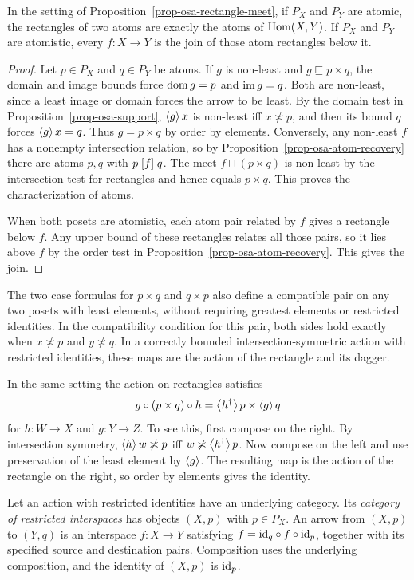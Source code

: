 \begin{prop}\label{prop-osa-atomic-rectangles}
In the setting of Proposition~\ref{prop-osa-rectangle-meet},
if $P_X$ and $P_Y$ are atomic, the rectangles of two atoms
are exactly the atoms of $\operatorname{Hom}(X,Y)$. If $P_X$ and $P_Y$
are atomistic, every $f:X\to Y$ is the join of those atom
rectangles below it.
\end{prop}

\begin{proof}
Let $p\in P_X$ and $q\in P_Y$ be atoms. If $g$ is non-least and
$g\sqsubseteq p\times q$, the domain and image bounds force
$\operatorname{dom} g=p$ and $\operatorname{im} g=q$. Both are non-least, since a least
image or domain forces the arrow to be least. By the domain
test in Proposition~\ref{prop-osa-support}, $\left\langle g\right\rangle x$ is
non-least iff $x\nasymp p$, and then its bound $q$ forces
$\left\langle g\right\rangle x=q$. Thus $g=p\times q$ by order by elements.
Conversely, any non-least $f$ has a nonempty intersection
relation, so by Proposition~\ref{prop-osa-atom-recovery} there
are atoms $p,q$ with $p\mathrel{\left[f\right]}q$. The meet $f\sqcap(p\times q)$
is non-least by the intersection test for rectangles and
hence equals $p\times q$. This proves the characterization of
atoms.

When both posets are atomistic, each atom pair related by $f$
gives a rectangle below $f$. Any upper bound of these rectangles
relates all those pairs, so it lies above $f$ by the order test in
Proposition~\ref{prop-osa-atom-recovery}. This gives the join.
\end{proof}

The two case formulas for $p\times q$ and $q\times p$ also define
a compatible pair on any two posets with least elements, without
requiring greatest elements or restricted identities. In the
compatibility condition for this pair, both sides hold exactly
when $x\nasymp p$ and $y\nasymp q$. In a correctly bounded
intersection-symmetric action with restricted identities, these
maps are the action of the rectangle and its dagger.

In the same setting the action on rectangles satisfies
\[
 g\circ(p\times q)\circ h=\left\langle h^\dagger\right\rangle p\times\left\langle g\right\rangle q
\]
for $h:W\to X$ and $g:Y\to Z$. To see this, first compose on the
right. By intersection symmetry, $\left\langle h\right\rangle w\not\asymp p$ iff
$w\not\asymp\left\langle h^\dagger\right\rangle p$. Now compose on the left and use
preservation of the least element by $\left\langle g\right\rangle$. The resulting map
is the action of the rectangle on the right, so order by elements
gives the identity.

\begin{defn}\label{def-osa-restricted-category}
Let an action with restricted identities have an underlying category.
Its \emph{category of restricted interspaces} has objects $(X,p)$
with $p\in P_X$. An arrow from $(X,p)$ to $(Y,q)$ is an interspace
$f:X\to Y$ satisfying $f={\operatorname{id}}_q\circ f\circ{\operatorname{id}}_p$, together
with its specified source and destination pairs. Composition uses
the underlying composition, and the identity of $(X,p)$ is ${\operatorname{id}}_p$.
\end{defn}

